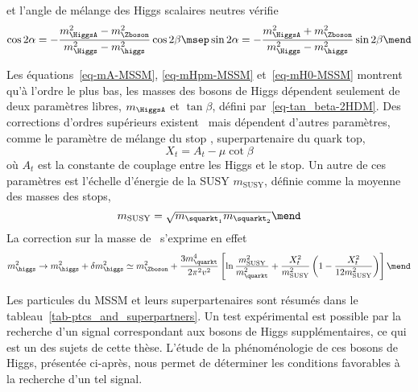 et l'angle de mélange des Higgs scalaires neutres vérifie
\begin{equation}
\cos 2\alpha = - \frac{m_{\HiggsA}^2-m_{\Zboson}^2}{m_{\Higgs}^2-m_{\higgs}^2} \cos 2\beta
\msep
\sin 2\alpha = - \frac{m_{\HiggsA}^2+m_{\Zboson}^2}{m_{\Higgs}^2-m_{\higgs}^2} \sin 2\beta
\mend
\label{eq-Higgs_mixing_angle_MSSM}
\end{equation}
\par Les équations~\eqref{eq-mA-MSSM}, \eqref{eq-mHpm-MSSM} et~\eqref{eq-mH0-MSSM} montrent qu'à l'ordre le plus bas, les masses des bosons de Higgs dépendent seulement de deux paramètres libres, $m_{\HiggsA}$ et $\tan\beta$, défini par~\eqref{eq-tan_beta-2HDM}.
Des corrections d'ordres supérieurs existent~\cite{Nagashima_BSM} mais dépendent d'autres paramètres, comme le paramètre de mélange du stop \squarkt, superpartenaire du quark top,
\begin{equation}
X_t = A_t - \mu\cot\beta
\end{equation}
où $A_t$ est la constante de couplage entre les Higgs et le stop.
Un autre de ces paramètres est l'échelle d'énergie de la SUSY $m_\text{SUSY}$, définie comme la moyenne des masses des stops,
\begin{equation}
m_\text{SUSY} = \sqrt{m_{\squarkt_1}m_{\squarkt_2}}
\mend
\end{equation}
La correction sur la masse de \higgs\ s'exprime en effet~\cite{Nagashima_BSM}
\begin{equation}
m_{\higgs}^2 \to m_{\higgs}^2 + \delta m_{\higgs}^2 \simeq m_{\Zboson}^2 + \frac{3 m_{\quarkt}^4}{2 \pi^2 v^2} \left[ \ln\frac{m_\text{SUSY}^2}{m_{\quarkt}^2} + \frac{X_t^2}{m_\text{SUSY}^2}\left(1-\frac{X_t^2}{12 m_\text{SUSY}^2}\right) \right]
\mend
\end{equation}
\par Les particules du MSSM et leurs superpartenaires sont résumés dans le tableau~\ref{tab-ptcs_and_superpartners}.
Un test expérimental est possible par la recherche d'un signal correspondant aux bosons de Higgs supplémentaires, ce qui est un des sujets de cette thèse.
L'étude de la phénoménologie de ces bosons de Higgs, présentée ci-après, nous permet de déterminer les conditions favorables à la recherche d'un tel signal.
